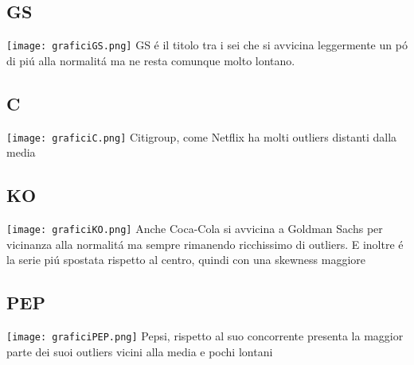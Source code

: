 \documentclass{report}
\begin{document}
\subsection{GS}
\texttt{[image: graficiGS.png]}
GS é il titolo tra i sei che si avvicina leggermente un pó di piú alla normalitá ma ne resta comunque molto lontano.
\subsection{C}
\texttt{[image: graficiC.png]}
Citigroup, come Netflix ha molti outliers distanti dalla media
\subsection{KO}
\texttt{[image: graficiKO.png]}
Anche Coca-Cola si avvicina a Goldman Sachs per vicinanza alla normalitá ma sempre rimanendo ricchissimo di outliers. E inoltre é la serie piú spostata rispetto al centro, quindi con una skewness maggiore
\subsection{PEP}
\texttt{[image: graficiPEP.png]}
Pepsi, rispetto al suo concorrente presenta la maggior parte dei suoi outliers vicini alla media e pochi lontani
\end{document}
